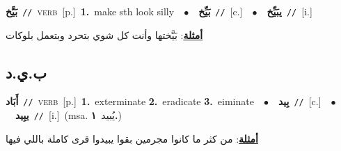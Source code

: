 \documentclass[10pt,a4paper,twoside]{article} %
\begin{document}
\begin{multicols}{2}
{\setlength\topsep{0pt}\textbf{\foreignlanguage{arabic}{بَيَّخ}}\ {\color{gray}\texttt{//}\color{black}}\ \textsc{verb}\ [p.]\ \textbf{1.}~make sth look silly\ \ $\bullet$\ \ \setlength\topsep{0pt}\textbf{\foreignlanguage{arabic}{بَيِّخ}}\ {\color{gray}\texttt{//}\color{black}}\ [c.]\ \ $\bullet$\ \ \setlength\topsep{0pt}\textbf{\foreignlanguage{arabic}{يبَيِّخ}}\ {\color{gray}\texttt{//}\color{black}}\ [i.]\  \begin{flushright}\color{gray}\foreignlanguage{arabic}{\textbf{\underline{\foreignlanguage{arabic}{أمثلة}}}: بَيَّختها وأنت كل شوي بتحرد وبتعمل بلوكات}\end{flushright}\color{black}} \vspace{2mm}

\vspace{-3mm}
\subsection*{\color{blue}\foreignlanguage{arabic}{ب.ي.د}\color{blue}{}} 

{\setlength\topsep{0pt}\textbf{\foreignlanguage{arabic}{أَبَاد}}\ {\color{gray}\texttt{//}\color{black}}\ \textsc{verb}\ [p.]\ \textbf{1.}~exterminate  \textbf{2.}~eradicate  \textbf{3.}~eiminate\ \ $\bullet$\ \ \setlength\topsep{0pt}\textbf{\foreignlanguage{arabic}{بِيد}}\ {\color{gray}\texttt{//}\color{black}}\ [c.]\ \ $\bullet$\ \ \setlength\topsep{0pt}\textbf{\foreignlanguage{arabic}{يبِيد}}\ {\color{gray}\texttt{//}\color{black}}\ [i.]\ \color{gray}(msa. \foreignlanguage{arabic}{يُبيد}~\foreignlanguage{arabic}{\textbf{١.}})\color{black}\  \begin{flushright}\color{gray}\foreignlanguage{arabic}{\textbf{\underline{\foreignlanguage{arabic}{أمثلة}}}: من كثر ما كانوا مجرمين بقوا يبيدوا قرى كاملة باللي فيها}\end{flushright}\color{black}} \vspace{2mm}


\end{multicols}
\end{document}
